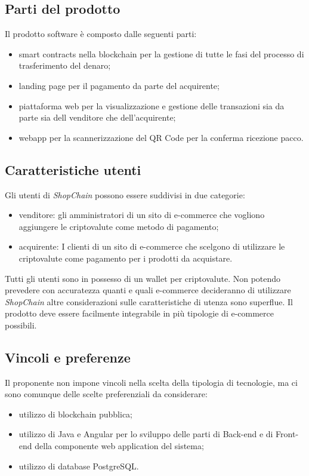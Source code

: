 \documentclass[a4paper, 12pt]{article}
\begin{document}
\subsection{Parti del prodotto}
Il prodotto software è composto dalle seguenti parti:
\begin{itemize}
\item smart contracts nella blockchain per la gestione di tutte le fasi del processo di trasferimento del denaro;
\item landing page per il pagamento da parte del acquirente;
\item piattaforma web per la visualizzazione e gestione delle transazioni sia da parte sia dell venditore che dell'acquirente;
\item webapp per la scannerizzazione del QR Code per la conferma ricezione pacco.
\end{itemize}
\subsection{Caratteristiche utenti}
Gli utenti di \textit{ShopChain} possono essere suddivisi in due categorie:
\begin{itemize}
\item venditore: gli amministratori di un sito di e-commerce che vogliono aggiungere le criptovalute come metodo di pagamento;
\item acquirente: I clienti di un sito di e-commerce che scelgono di utilizzare le criptovalute come pagamento per i prodotti da acquistare.
\end{itemize}
Tutti gli utenti sono in possesso di un wallet per criptovalute. 
Non potendo prevedere con accuratezza quanti e quali e-commerce decideranno di utilizzare \textit{ShopChain} altre considerazioni sulle caratteristiche di utenza sono superflue. Il prodotto deve essere facilmente integrabile in più tipologie di e-commerce possibili.

\subsection{Vincoli e preferenze}
Il proponente non impone vincoli nella scelta della tipologia di tecnologie, ma ci sono comunque delle scelte preferenziali da considerare:
\begin{itemize}
\item utilizzo di blockchain pubblica;
\item utilizzo di Java e Angular per lo sviluppo delle parti di Back-end e di Front-end della componente web application del sistema;
\item utilizzo di database PostgreSQL.
\end{itemize}
\end{document}
